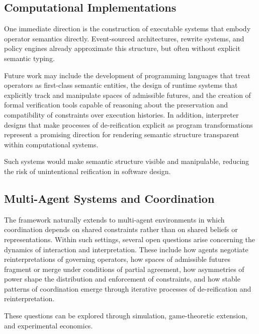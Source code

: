 \documentclass[11pt]{article}
\begin{document}
\subsection{Computational Implementations}

One immediate direction is the construction of executable systems that embody
operator semantics directly. Event-sourced architectures, rewrite systems, and
policy engines already approximate this structure, but often without explicit
semantic typing.

Future work may include the development of programming languages that treat
operators as first-class semantic entities, the design of runtime systems that
explicitly track and manipulate spaces of admissible futures, and the creation
of formal verification tools capable of reasoning about the preservation and
compatibility of constraints over execution histories. In addition, interpreter
designs that make processes of de-reification explicit as program
transformations represent a promising direction for rendering semantic structure
transparent within computational systems.

Such systems would make semantic structure visible and manipulable, reducing the
risk of unintentional reification in software design.

\subsection{Multi-Agent Systems and Coordination}

The framework naturally extends to multi-agent environments in which coordination
depends on shared constraints rather than on shared beliefs or representations.
Within such settings, several open questions arise concerning the dynamics of
interaction and interpretation. These include how agents negotiate
reinterpretations of governing operators, how spaces of admissible futures
fragment or merge under conditions of partial agreement, how asymmetries of power
shape the distribution and enforcement of constraints, and how stable patterns of
coordination emerge through iterative processes of de-reification and
reinterpretation.

These questions can be explored through simulation, game-theoretic extension,
and experimental economics.
\end{document}
